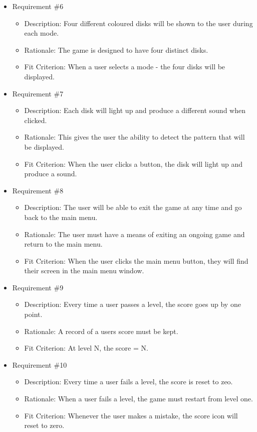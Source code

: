 \documentclass[12pt, titlepage]{article}
\begin{document}
\begin{itemize}
\item Requirement \#6
\begin{itemize}
\item Description: Four different coloured disks will be shown to the user during each mode.
\item Rationale: The game is designed to have four distinct disks.
\item Fit Criterion: When a user selects a mode - the four disks will be displayed. 
\end{itemize}

\item Requirement \#7
\begin{itemize}
\item Description: Each disk will light up and produce a different sound when clicked.
\item Rationale: This gives the user the ability to detect the pattern that will be displayed.
\item Fit Criterion: When the user clicks a button, the disk will light up and produce a sound.
\end{itemize}

\item Requirement \#8
\begin{itemize}
\item Description: The user will be able to exit the game at any time and go back to the main menu. 
\item Rationale: The user must have a means of exiting an ongoing game and return to the main menu.
\item Fit Criterion: When the user clicks the main menu button, they will find their screen in the main menu window.
\end{itemize}

\item Requirement \#9
\begin{itemize}
\item Description: Every time a user passes a level, the score goes up by one point.
\item Rationale: A record of a users score must be kept. 
\item Fit Criterion: At level N, the score = N.
\end{itemize}

\item Requirement \#10
\begin{itemize}
\item Description: Every time a user fails a level, the score is reset to zeo.
\item Rationale: When a user fails a level, the game must restart from level one.
\item Fit Criterion: Whenever the user makes a mistake, the score icon will reset to zero.
\end{itemize}


\end{itemize}
\end{document}
